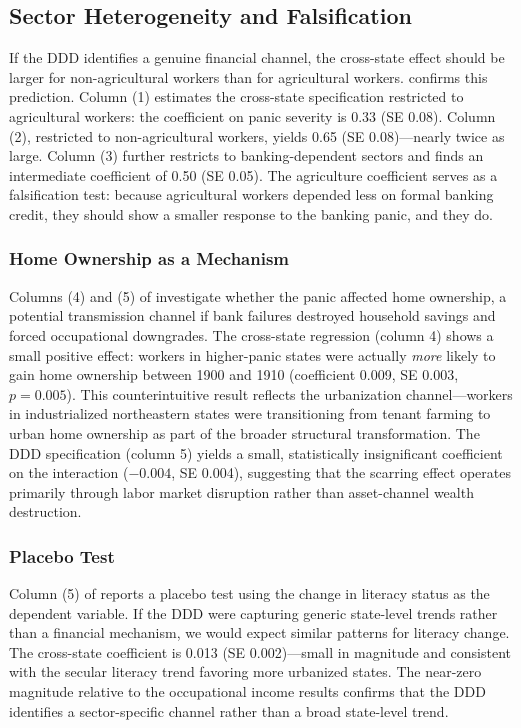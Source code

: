\documentclass[12pt]{article}
\begin{document}
\subsection{Sector Heterogeneity and Falsification}

If the DDD identifies a genuine financial channel, the cross-state effect should be larger for non-agricultural workers than for agricultural workers.  confirms this prediction. Column (1) estimates the cross-state specification restricted to agricultural workers: the coefficient on panic severity is 0.33 (SE 0.08). Column (2), restricted to non-agricultural workers, yields 0.65 (SE 0.08)---nearly twice as large. Column (3) further restricts to banking-dependent sectors and finds an intermediate coefficient of 0.50 (SE 0.05). The agriculture coefficient serves as a falsification test: because agricultural workers depended less on formal banking credit, they should show a smaller response to the banking panic, and they do.



\subsubsection*{Home Ownership as a Mechanism} Columns (4) and (5) of  investigate whether the panic affected home ownership, a potential transmission channel if bank failures destroyed household savings and forced occupational downgrades. The cross-state regression (column 4) shows a small positive effect: workers in higher-panic states were actually \textit{more} likely to gain home ownership between 1900 and 1910 (coefficient 0.009, SE 0.003, $p = 0.005$). This counterintuitive result reflects the urbanization channel---workers in industrialized northeastern states were transitioning from tenant farming to urban home ownership as part of the broader structural transformation. The DDD specification (column 5) yields a small, statistically insignificant coefficient on the interaction ($-0.004$, SE 0.004), suggesting that the scarring effect operates primarily through labor market disruption rather than asset-channel wealth destruction.

\subsubsection*{Placebo Test} Column (5) of  reports a placebo test using the change in literacy status as the dependent variable. If the DDD were capturing generic state-level trends rather than a financial mechanism, we would expect similar patterns for literacy change. The cross-state coefficient is 0.013 (SE 0.002)---small in magnitude and consistent with the secular literacy trend favoring more urbanized states. The near-zero magnitude relative to the occupational income results confirms that the DDD identifies a sector-specific channel rather than a broad state-level trend.
\end{document}
